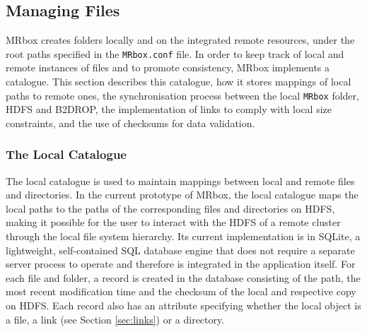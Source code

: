\subsection{Managing Files}
MRbox creates folders locally and on the integrated remote resources, under the root paths specified in the \texttt{MRbox.conf} file. In order to keep track of local and remote instances of files and to promote consistency, MRbox implements a catalogue. This section describes this catalogue, how it stores mappings of local paths to remote ones, the synchronisation process between the local \texttt{MRbox} folder, HDFS and B2DROP, the implementation of links to comply with local size constraints, and the use of checksums for data validation.

\subsubsection{The Local Catalogue}

The local catalogue is used to maintain mappings between local and remote files and directories. In the current prototype of MRbox, the local catalogue maps the local paths to the paths of the corresponding files and directories on HDFS, making it possible for the user to interact with the HDFS of a remote cluster through the local file system hierarchy. Its current implementation is in SQLite\cite{sqlite}, a lightweight, self-contained SQL database engine that does not require a separate server process to operate and therefore is integrated in the application itself. For each file and folder, a record is created in the database consisting of the path, the most recent modification time and the checksum of the local and respective copy on HDFS. Each record also has an attribute specifying whether the local object is a file, a link (see Section \ref{sec:links}) or a directory.

